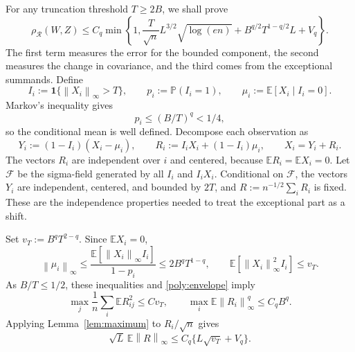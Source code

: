 \documentclass[11pt,letterpaper]{article}
\theoremstyle{remark}
\newcommand{\E}{\mathbb E}
\newcommand{\Pp}{\mathbb P}
\newcommand{\norm}[1]{\left\lVert#1\right\rVert}
\newcommand{\rh}{\rho_{\mathcal R}}
\newcommand{\ind}{\mathbf 1}
\begin{document}
For any truncation threshold \(T\ge2B\), we shall prove
\begin{equation}
 \rh(W,Z)\le C_q\min\left\{1,
 \frac{T}{\sqrt n}L^{3/2}\sqrt{\log(en)}
 +B^{q/2}T^{1-q/2}L+V_q\right\}.
 \label{poly:threshold}
\end{equation}
The first term measures the error for the bounded component, the
second measures the change in covariance, and the third comes from
the exceptional {summands}. Define
\[
 I_i:=\ind\{\norm{X_i}_\infty>T\},\qquad
 p_i:=\Pp(I_i=1),\qquad \mu_i:=\E[X_i\mid I_i=0].
\]
Markov's inequality gives 
{
\begin{equation}
p_i\le(B/T)^q<1/4, 
\label{app:p_i-bound}
\end{equation}
}
so the conditional
mean is well defined. Decompose each observation as
\begin{equation}
 Y_i:=(1-I_i)(X_i-\mu_i),\qquad
 R_i:=I_iX_i+(1-I_i)\mu_i,\qquad X_i=Y_i+R_i.
 \label{app:decomposition}
\end{equation}
The vectors \(R_i\) are {independent over \(i\)} and centered, because
\(\E R_i=\E X_i=0\). Let \(\mathcal F\) be the sigma-field generated
by all \(I_i\) and \(I_iX_i\). Conditional on \(\mathcal F\), the
vectors \(Y_i\) are independent, centered, and bounded by \(2T\),
and \(R:=n^{-1/2}\sum_iR_i\) is fixed. These are the independence
properties needed to treat the exceptional part as a shift.

Set \(v_T:=B^qT^{2-q}\). Since \(\E X_i=0\),
\begin{equation}
 \norm{\mu_i}_\infty
 \le\frac{\E[\norm{X_i}_\infty I_i]}{1-p_i}
 \le2B^qT^{1-q},\qquad
 \E[\norm{X_i}_\infty^2 I_i]\le v_T.
 \label{app:tail-moments}
\end{equation}
{
As \(B/T\le1/2\), these inequalities and \eqref{poly:envelope} imply
}
\[
 \max_j\frac1n\sum_i\E R_{ij}^2\le C v_T,\qquad
 \max_i\E\norm{R_i}_\infty^q\le C_qB^q.
\]
Applying Lemma~\ref{lem:maximum} to \(R_i/\sqrt n\) gives
\begin{equation}
 \sqrt L\,\E\norm R_\infty
 \le C_q\{L\sqrt{v_T}+V_q\}.
 \label{app:shift}
\end{equation}
\end{document}
